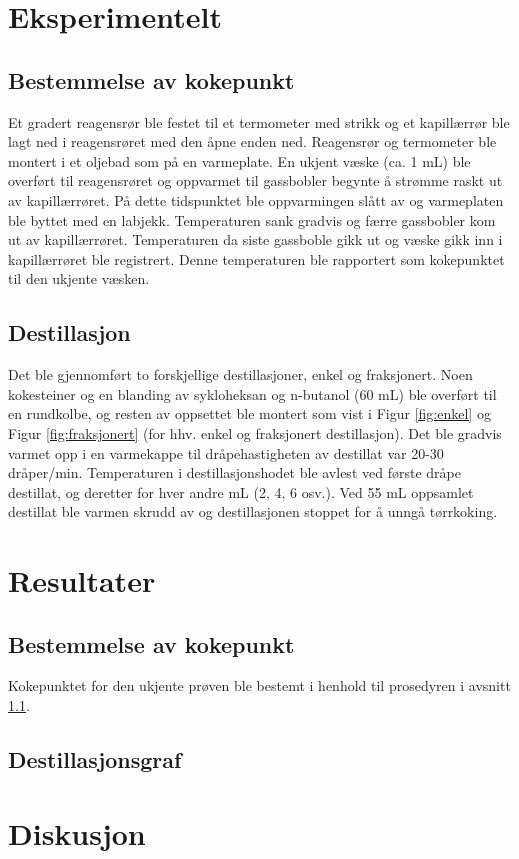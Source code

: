 \section{Eksperimentelt}

\subsection{Bestemmelse av kokepunkt}\label{sec:eksperimentelt_1}

Et gradert reagensrør ble festet til et termometer med strikk og et kapillærrør ble lagt ned i reagensrøret med den åpne enden ned. Reagensrør og termometer ble montert i et oljebad som på en varmeplate. En ukjent væske (ca. 1 mL) ble overført til reagensrøret og oppvarmet til gassbobler begynte å strømme raskt ut av kapillærrøret. På dette tidspunktet ble oppvarmingen slått av og varmeplaten ble byttet med en labjekk. Temperaturen sank gradvis og færre gassbobler kom ut av kapillærrøret.  Temperaturen da siste gassboble gikk ut og væske gikk inn i kapillærrøret ble registrert. Denne temperaturen ble rapportert som kokepunktet til den ukjente væsken. 

\subsection{Destillasjon}

Det ble gjennomført to forskjellige destillasjoner, enkel og fraksjonert. Noen kokesteiner og en blanding av sykloheksan og n-butanol (60 mL) ble overført til en rundkolbe, og resten av oppsettet ble montert som vist i Figur \ref{fig:enkel} og Figur \ref{fig:fraksjonert} (for hhv. enkel og fraksjonert destillasjon). Det ble gradvis varmet opp i en varmekappe til dråpehastigheten av destillat var 20-30 dråper/min. Temperaturen i destillasjonshodet ble avlest ved første dråpe destillat, og deretter for hver andre mL (2, 4, 6 osv.). Ved 55 mL oppsamlet destillat ble varmen skrudd av og destillasjonen stoppet for å unngå tørrkoking.

\section{Resultater}

\subsection{Bestemmelse av kokepunkt}

Kokepunktet for den ukjente prøven ble bestemt i henhold til prosedyren i avsnitt \ref{sec:eksperimentelt_1}. 

\subsection{Destillasjonsgraf}


\section{Diskusjon}
